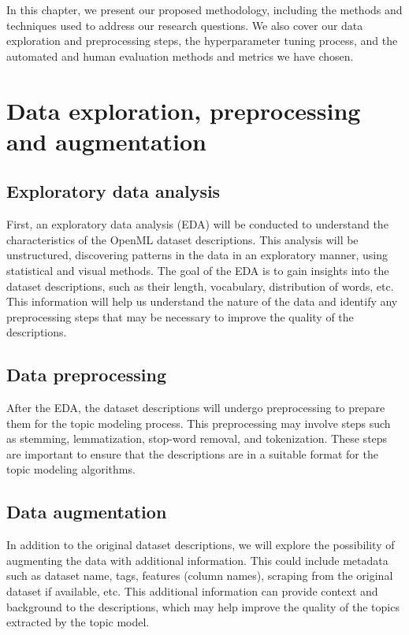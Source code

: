 In this chapter, we present our proposed methodology, including the methods and techniques used to address our research questions. We also cover our data exploration and preprocessing steps, the hyperparameter tuning process, and the automated and human evaluation methods and metrics we have chosen.

\section{Data exploration, preprocessing and augmentation}
\subsection{Exploratory data analysis}
First, an exploratory data analysis (EDA) will be conducted to understand the characteristics of the OpenML dataset descriptions. This analysis will be unstructured, discovering patterns in the data in an exploratory manner, using statistical and visual methods. The goal of the EDA is to gain insights into the dataset descriptions, such as their length, vocabulary, distribution of words, etc. This information will help us understand the nature of the data and identify any preprocessing steps that may be necessary to improve the quality of the descriptions.

\subsection{Data preprocessing}
After the EDA, the dataset descriptions will undergo preprocessing to prepare them for the topic modeling process. This preprocessing may involve steps such as stemming, lemmatization, stop-word removal, and tokenization. These steps are important to ensure that the descriptions are in a suitable format for the topic modeling algorithms.

\subsection{Data augmentation}
In addition to the original dataset descriptions, we will explore the possibility of augmenting the data with additional information. This could include metadata such as dataset name, tags, features (column names), scraping from the original dataset if available, etc. This additional information can provide context and background to the descriptions, which may help improve the quality of the topics extracted by the topic model.

